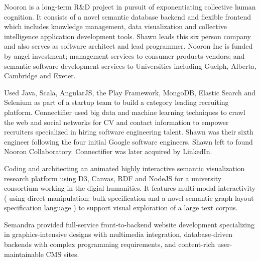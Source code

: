 \documentclass[line,margin,hidelinks]{res}
\begin{document}
\begin{resume}

\begin{position}
Nooron is a long-term R\&D project in pursuit of exponentiating
collective human cognition.  It consists of a novel semantic database
backend and flexible frontend which includes knowledge management,
data visualization and collective intelligence application development
tools.  Shawn leads this six person company and also serves as
software architect and lead programmer.  Nooron Inc is funded by
angel investment; management services to consumer products vendors;
and semantic software development services to Universities including
Guelph, Alberta, Cambridge and Exeter.
\end{position}


\begin{position}
Used Java, Scala, AngularJS, the Play Framework, MongoDB, Elastic
Search and Selenium as part of a startup team to build a category
leading recruiting platform.  Connectifier used big data and machine
learning techniques to crawl the web and social networks for CV and
contact information to empower recruiters specialized in hiring
software engineering talent.  Shawn was their sixth engineer following
the four initial Google software engineers.  Shawn left to found Nooron
Collaboratory.  Connectifier was later acquired by LinkedIn.
\end{position}


\begin{position}
Coding and architecting an animated highly interactive semantic
visualization research platform using D3, Canvas, RDF and NodeJS for a
university consortium working in the digial humanities.  It features
multi-modal interactivity ( using direct manipulation; bulk
specification and a novel semantic graph layout specification language
) to support visual exploration of a large text corpus.
\end{position}


\begin{position}
Semandra provided full-service front-to-backend
website development specializing in graphics-intensive designs with
multimedia integration, database-driven backends with complex
programming requirements, and content-rich user-maintainable CMS
sites.


\end{position}
\end{resume}
\end{document}
